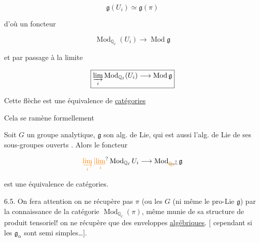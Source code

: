\[
\mathfrak g(U_i)\simeq\mathfrak g(\pi)
\]

d'où un foncteur

\[
\operatorname{Mod}_{\mathbb Q_\ell}(U_i)\longrightarrow\operatorname{Mod}\mathfrak g
\]

et par passage à la limite

\[
\boxed{\varinjlim_i\operatorname{Mod}_{\mathbb Q_\ell}(U_i)\longrightarrow\operatorname{Mod}\mathfrak g}
\]

Cette flèche est une équivalence de \uline{catégories}

Cela se ramène formellement  

\uline{} Soit $G$ un groupe analytique, $\mathfrak g$ son alg. de Lie, qui est aussi l'alg. de Lie de ses sous-groupes ouverts . Alors le foncteur

\[
\unsure{\varinjlim_i|\underset{i}{\underline{\lim}}}\operatorname{Mod}_{\mathbb Q_\ell}U_i\longrightarrow\operatorname{Mod}_{\deleted{\unsure{\mathbb Q_\ell}}}\mathfrak g
\]

est une équivalence de catégories.

6.5. On fera attention  on ne récupère pas $\pi$ (ou les  $G$  (ni même le pro-Lie $\mathfrak g$) par la connaissance de la catégorie $\operatorname{Mod}_{\mathbb Q_\ell}(\pi)$, même munie de sa structure de produit tensoriel! on ne récupère que des enveloppes \uline{algébriques}. [ cependant si  les $\mathfrak g_\alpha$ sont semi simples\ldots].


